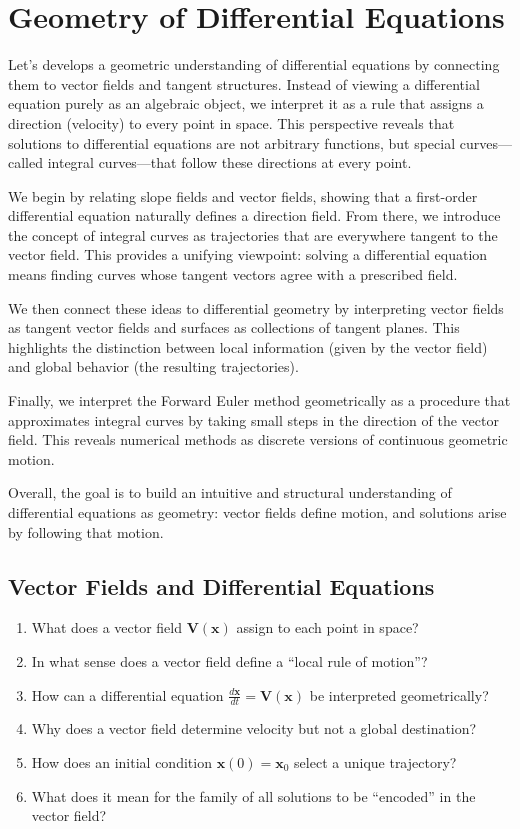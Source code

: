 \section{Geometry of Differential Equations}

Let's develops a geometric understanding of differential equations by connecting them to vector fields and tangent structures. Instead of viewing a differential equation purely as an algebraic object, we interpret it as a rule that assigns a direction (velocity) to every point in space. This perspective reveals that solutions to differential equations are not arbitrary functions, but special curves—called integral curves—that follow these directions at every point.

We begin by relating slope fields and vector fields, showing that a first-order differential equation naturally defines a direction field. From there, we introduce the concept of integral curves as trajectories that are everywhere tangent to the vector field. This provides a unifying viewpoint: solving a differential equation means finding curves whose tangent vectors agree with a prescribed field.

We then connect these ideas to differential geometry by interpreting vector fields as tangent vector fields and surfaces as collections of tangent planes. This highlights the distinction between local information (given by the vector field) and global behavior (the resulting trajectories).

Finally, we interpret the Forward Euler method geometrically as a procedure that approximates integral curves by taking small steps in the direction of the vector field. This reveals numerical methods as discrete versions of continuous geometric motion.

Overall, the goal is to build an intuitive and structural understanding of differential equations as geometry: vector fields define motion, and solutions arise by following that motion.

\subsection{Vector Fields and Differential Equations}

\begin{enumerate}
  \item What does a vector field \(\mathbf{V}(\mathbf{x})\) assign to each point in space?
  \item In what sense does a vector field define a ``local rule of motion''?
  \item How can a differential equation \(\frac{d\mathbf{x}}{dt}= \mathbf{V}(\mathbf{x})\) be interpreted geometrically?
  \item Why does a vector field determine velocity but not a global destination?
  \item How does an initial condition \(\mathbf{x}(0)=\mathbf{x}_{0}\) select a unique trajectory?
  \item What does it mean for the family of all solutions to be ``encoded'' in the vector field?
\end{enumerate}

